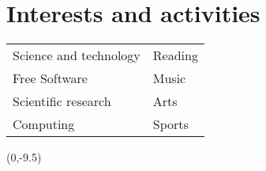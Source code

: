 \documentclass[letterpaper,10pt]{article}
\begin{document}
\section{Interests and activities}
    \begin{tabular}{ll}
        Science and technology          & Reading \\
        Free Software                   & Music \\
        Scientific research             & Arts  \\
        Computing                       & Sports \\
    \end{tabular}

\begin{textblock}{1}(0,-9.5)
\end{textblock}
\end{document}
